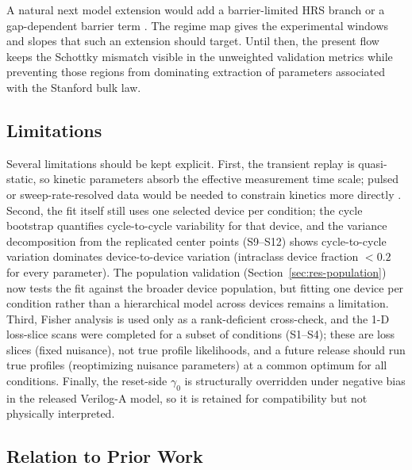 \documentclass[journal]{IEEEtran}
\begin{document}
A natural next model extension would add a barrier-limited HRS branch or a
gap-dependent barrier term \cite{chiu2014,bocquet2014,bengel2020jart}.  The
regime map gives the experimental windows and slopes that such an extension
should target.  Until then, the present flow keeps the Schottky mismatch
visible in the unweighted validation metrics while preventing those regions
from dominating extraction of parameters associated with the Stanford bulk
law.

\subsection{Limitations}

Several limitations should be kept explicit.  First, the transient replay is
quasi-static, so kinetic parameters absorb the effective measurement time
scale; pulsed or sweep-rate-resolved data would be needed to constrain
kinetics more directly \cite{ielmini2016}.  Second, the fit itself still uses
one selected device per condition; the cycle bootstrap quantifies cycle-to-cycle
variability for that device, and the variance decomposition from the replicated
center points (S9--S12) shows cycle-to-cycle variation dominates device-to-device
variation (intraclass device fraction $<0.2$ for every parameter).  The
population validation (Section~\ref{sec:res-population}) now tests the fit
against the broader device population, but fitting one device per condition
rather than a hierarchical model across devices remains a limitation.  Third,
Fisher analysis is used only as a rank-deficient cross-check, and the 1-D
loss-slice scans were completed for a subset of conditions (S1--S4); these are
loss slices (fixed nuisance), not true profile likelihoods, and a future release
should run true profiles (reoptimizing nuisance parameters) at a common optimum
for all conditions.  Finally, the reset-side $\gamma_0$ is structurally
overridden under negative bias in the released Verilog-A model, so it is
retained for compatibility but not physically interpreted.

\subsection{Relation to Prior Work}
\end{document}
